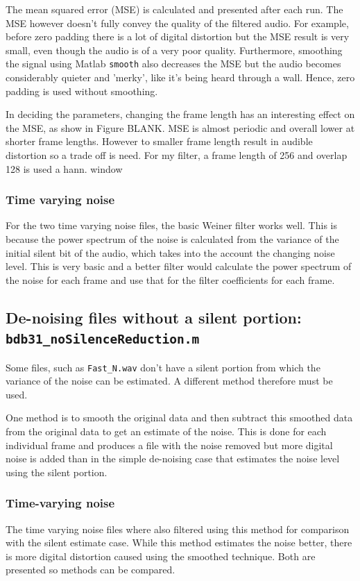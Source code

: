 \documentclass[11pt]{article}
\begin{document}
The mean squared error (MSE) is calculated and presented after each run. The MSE however doesn't fully convey the quality of the filtered audio. For example, before zero padding there is a lot of digital distortion but the MSE result is very small, even though the audio is of a very poor quality. Furthermore, smoothing the signal using Matlab \texttt{smooth} also decreases the MSE but the audio becomes considerably quieter and 'merky', like it's being heard through a wall. Hence, zero padding is used without smoothing.

In deciding the parameters, changing the frame length has an interesting effect on the MSE, as show in Figure BLANK. MSE is almost periodic and overall lower at shorter frame lengths. However to smaller frame length result in audible distortion so a trade off is need. For my filter, a frame length of 256 and overlap 128 is used  a hann. window

\subsubsection{Time varying noise}
For the two time varying noise files, the basic Weiner filter works well. This is because the power spectrum of the noise is calculated from the variance of the initial silent bit of the audio, which takes into the account the changing noise level. This is very basic and a better filter would calculate the power spectrum of the noise for each frame and use that for the filter coefficients for each frame.

\subsection{De-noising files without a silent portion: \texttt{bdb31\_noSilenceReduction.m}}
Some files, such as \texttt{Fast\_N.wav} don't have a silent portion from which the variance of the noise can be estimated. A different method therefore must be used.

One method is to smooth the original data and then subtract this smoothed data from the original data to get an estimate of the noise. This is done for each individual frame and produces a file with the noise removed but more digital noise is added than in the simple de-noising case that estimates the noise level using the silent portion.

\subsubsection{Time-varying noise}
The time varying noise files where also filtered using this method for comparison with the silent estimate case. While this method estimates the noise better, there is more digital distortion caused using the smoothed technique. Both are presented so methods can be compared.
\end{document}
